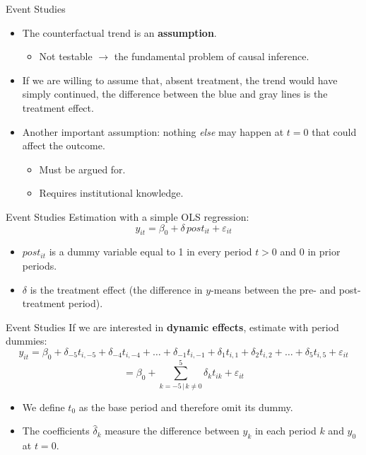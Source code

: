 \documentclass[11pt,aspectratio=169]{beamer}
\begin{document}
\begin{frame}{Event Studies}
  \begin{itemize}
    \item The counterfactual trend is an \textbf{assumption}.
    \begin{itemize}
      \item Not testable $\longrightarrow$ the fundamental problem of causal inference.
    \end{itemize}
    \item If we are willing to assume that, absent treatment, the trend would have simply continued, the difference between the blue and gray lines is the treatment effect.
    \item Another important assumption: nothing \emph{else} may happen at $t=0$ that could affect the outcome.
    \begin{itemize}
      \item Must be argued for.
      \item Requires institutional knowledge.
    \end{itemize}
  \end{itemize}
\end{frame}

\begin{frame}{Event Studies}
  Estimation with a simple OLS regression:
  \[
    y_{it} = \beta_0 + \delta\, post_{it} + \varepsilon_{it} \tag{2}
  \]
  \begin{itemize}
    \item $post_{it}$ is a dummy variable equal to 1 in every period $t > 0$ and 0 in prior periods.
    \item $\delta$ is the treatment effect (the difference in $y$-means between the pre- and post-treatment period).
  \end{itemize}
\end{frame}

\begin{frame}{Event Studies}
  If we are interested in \textbf{dynamic effects}, estimate with period dummies:
  \[
    y_{it} = \beta_0 + \delta_{-5} t_{i,-5} + \delta_{-4} t_{i,-4} + \dots + \delta_{-1} t_{i,-1} + \delta_1 t_{i,1} + \delta_2 t_{i,2} + \dots + \delta_5 t_{i,5} + \varepsilon_{it}
  \]
  \[
    = \beta_0 + \sum_{k=-5 \,|\, k \neq 0}^{5} \delta_k t_{ik} + \varepsilon_{it} \tag{3}
  \]
  \begin{itemize}
    \item We define $t_0$ as the base period and therefore omit its dummy.
    \item The coefficients $\hat\delta_k$ measure the difference between $y_k$ in each period $k$ and $y_0$ at $t=0$.
  \end{itemize}
\end{frame}
\end{document}
